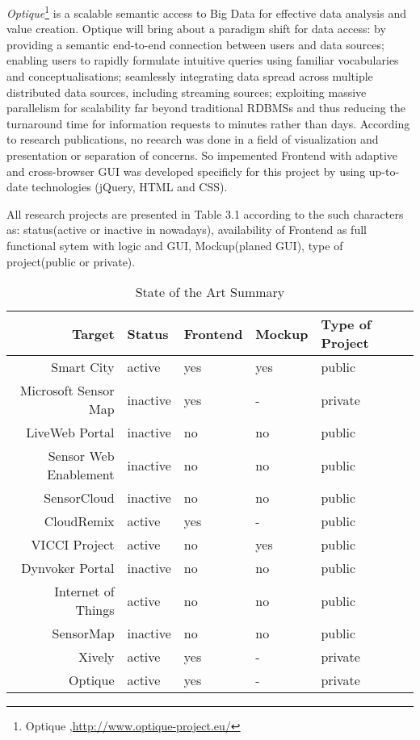     \emph{Optique}\footnote{Optique ,\url{http://www.optique-project.eu/}} is a scalable semantic access to Big Data for effective data analysis and value creation. Optique will bring about a paradigm shift for data access: by providing a semantic end-to-end connection between users and data sources; enabling users to rapidly formulate intuitive queries using familiar vocabularies and conceptualisations; seamlessly integrating data spread across multiple distributed data sources, including streaming sources; exploiting massive parallelism for scalability far beyond traditional RDBMSs and thus reducing the turnaround time for information requests to minutes rather than days\cite{calvanese-etal-JAIR-2013-explanation,ernestojimenezruizbernardocuencagrau2013ontology,DBLP:conf/dlog/MollerNOW13ohneCross}. According to research publications, no reearch was done in a field of visualization and presentation or separation of concerns. So impemented Frontend with adaptive and cross-browser GUI was developed specificly for this project by using up-to-date technologies (jQuery, HTML and CSS).

    All research projects are presented in Table 3.1 according to the such characters as: status(active or inactive in nowadays), availability of Frontend as full functional sytem with logic and GUI, Mockup(planed GUI), type of project(public or private).

    \begin{table}[H]
	\centering
	\begin{tabular}{|r|l|l|l|l|l|}
	\hline
	Target 			       & Status & Frontend & Mockup & Type of Project \\
	\hline 
	\hline
	Smart City		       & active & yes & yes & public \\
	\hline
	Microsoft Sensor Map   & inactive & yes & - & private \\
	\hline
	LiveWeb Portal	       & inactive & no & no & public \\
	\hline
	Sensor Web Enablement  & inactive & no & no & public \\
	\hline
	SensorCloud		       & inactive & no & no & public \\
	\hline
	CloudRemix		       & active & yes & - & public \\
	\hline
	VICCI Project		   & active & no & yes & public \\
	\hline
	Dynvoker Portal		   & inactive & no & no & public \\
	\hline
	Internet of Things	   & active & no & no & public \\
	\hline
	SensorMap              & inactive & no & no & public \\
	\hline
	Xively                 & active & yes & - & private \\
	\hline
	Optique                & active & yes & - & private \\
	\hline
	\end{tabular}
	\caption[State of the Art]{State of the Art Summary}
	\label{tab:state_of_the_art}
	\end{table}

